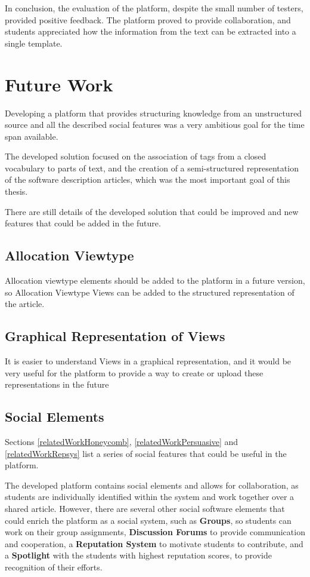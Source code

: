 \documentclass[conference]{IEEEtran}
\begin{document}
In conclusion, the evaluation of the platform, despite the small number of testers, provided positive feedback. The platform proved to provide collaboration, and students appreciated how the information from the text can be extracted into a single template. 

\section{Future Work}
\label{futureWork}
Developing a platform that provides structuring knowledge from an unstructured source and all the described social features was a very ambitious goal for the time span available. 

The developed solution focused on the association of tags from a closed vocabulary to parts of text, and the creation of a semi-structured representation of the software description articles, which was the most important goal of this thesis.

There are still details of the developed solution that could be improved and new features that could be added in the future.

\subsection{Allocation Viewtype}
Allocation viewtype elements should be added to the platform in a future version, so Allocation Viewtype Views can be added to the structured representation of the article.

\subsection{Graphical Representation of Views}
It is easier to understand Views in a graphical representation, and it would be very useful for the platform to provide a way to create or upload these representations in the future

\subsection{Social Elements}
Sections \ref{relatedWorkHoneycomb}, \ref{relatedWorkPersuasive} and  \ref{relatedWorkRepsys} list a series of social features that could be useful in the platform.

The developed platform contains social elements and allows for collaboration, as students are individually identified within the system and work together over a shared article. However, there are several other social software elements that could enrich the platform as a social system, such as \textbf{Groups}, so students can work on their group assignments, \textbf{Discussion Forums} to provide communication and cooperation, a \textbf{Reputation System} to motivate students to contribute, and a \textbf{Spotlight} with the students with highest reputation scores, to provide recognition of their efforts.
\end{document}

